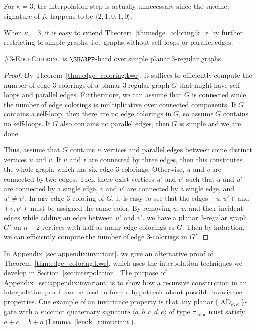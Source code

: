 \documentclass[11pt]{article}
\newcommand{\AD}{\operatorname{AD}}
\newenvironment{remark}{\medskip{\bfseries \noindent Remark:}}{\par\medskip}{\par\medskip}
\begin{document}
\begin{remark}
 For $\kappa = 3$,
 the interpolation step is actually unnecessary since the succinct signature of $f_2$ happens to be $\langle 2,1,0,1,0 \rangle$.
\end{remark}

When $\kappa = 3$,
it is easy to extend Theorem~\ref{thm:edge_coloring:k=r} by further restricting to simple graphs,
i.e.~graphs without self-loops or parallel edges.

\begin{theorem} \label{thm:edge_coloring:k=r=3_simple}
 \#$3$-\textsc{EdgeColoring} is $\SHARPP$-hard over simple planar $3$-regular graphs.
\end{theorem}

\begin{proof}
 By Theorem~\ref{thm:edge_coloring:k=r},
 it suffices to efficiently compute the number of edge $3$-colorings of a planar $3$-regular graph $G$ that might have self-loops and parallel edges.
 Furthermore, we can assume that $G$ is connected since the number of edge colorings is multiplicative over connected components.
 If $G$ contains a self-loop,
 then there are no edge colorings in $G$,
 so assume $G$ contains no self-loops.
 If $G$ also contains no parallel edges,
 then $G$ is simple and we are done.
 
 Thus, assume that $G$ contains $n$ vertices and parallel edges between some distinct vertices $u$ and $v$.
 If $u$ and $v$ are connected by three edges,
 then this constitutes the whole graph,
 which has six edge $3$-colorings.
 Otherwise, $u$ and $v$ are connected by two edges.
 Then there exist vertices $u'$ and $v'$ such that
 $u$ and $u'$ are connected by a single edge,
 $v$ and $v'$ are connected by a single edge,
 and $u' \ne v'$.
 In any edge $3$-coloring of $G$,
 it is easy to see that the edges $(u,u')$ and $(v,v')$ must be assigned the same color.
 By removing $u$, $v$, and their incident edges while adding an edge between $u'$ and $v'$,
 we have a planar $3$-regular graph $G'$ on $n - 2$ vertices with half as many edge colorings as $G$.
 Then by induction,
 we can efficiently compute the number of edge $3$-colorings in $G'$.
\end{proof}

In Appendix~\ref{sec:appendix:invariant},
we give an alternative proof of Theorem~\ref{thm:edge_coloring:k=r},
which uses the interpolation techniques we develop in Section~\ref{sec:interpolation}.
The purpose of Appendix~\ref{sec:appendix:invariant} is to show how a recursive construction in an interpolation proof
can be used to form a hypothesis about possible invariance properties.
One example of an invariance property is that any planar $\{\AD_{\kappa,\kappa}\}$-gate
with a succinct quaternary signature $\langle a,b,c,d,e \rangle$ of type $\tau_\text{color}$ must satisfy $a + c = b + d$ (Lemma~\ref{lem:k=r:invariant}).
\end{document}
